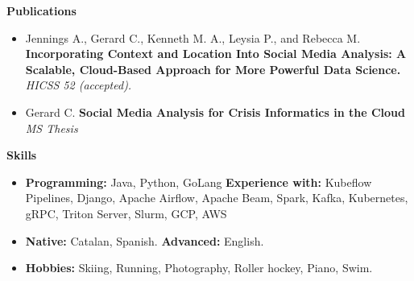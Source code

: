 \documentclass[letterpaper,10pt]{article}
\newcommand{\resitem}[1]{\item #1 \vspace{-2pt}}
\newcommand{\resheading}[1]{{\large \colorbox{mygrey}{\begin{minipage}{\textwidth}{\textbf{#1 \vphantom{p\^{E}}}}\end{minipage}}}}
\begin{document}
\resheading{Publications}
	\begin{itemize}
		\item 	Jennings A., Gerard C., Kenneth M. A., Leysia P., and Rebecca M.  \textbf{Incorporating Context and Location Into Social Media Analysis: A Scalable, Cloud-Based Approach for More Powerful Data Science.}  \textit{HICSS 52 (accepted).}
        \item Gerard C. \textbf{Social Media Analysis for Crisis Informatics in the Cloud} \textit{MS Thesis}
	\end{itemize}


\resheading{Skills}
	\begin{itemize}
		\resitem{\textbf{Programming:} Java, Python, GoLang \textbf{Experience with:} Kubeflow Pipelines, Django, Apache Airflow, Apache Beam, Spark, Kafka, Kubernetes, gRPC, Triton Server, Slurm, GCP, AWS }
		\resitem{\textbf{Native:} Catalan, Spanish. \textbf{Advanced:} English.}
		\resitem{\textbf{Hobbies:} Skiing, Running, Photography, Roller hockey, Piano, Swim.}
	\end{itemize}
\end{document}
